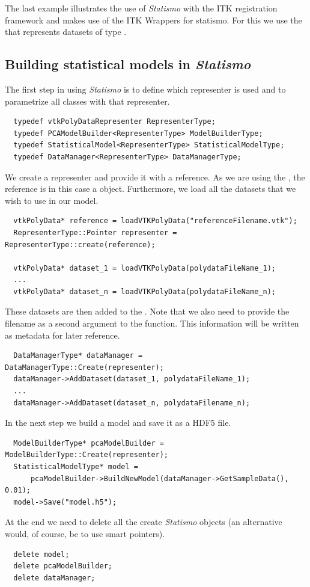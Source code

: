 \documentclass{InsightArticle}
\newcommand{\Statismo}{\emph{Statismo}\xspace}
\begin{document}
The last example illustrates the use of \Statismo with the ITK
registration framework and makes use of the ITK Wrappers for
statismo. For this we use the  that represents datasets
of type . 


\subsection{Building statistical models in \Statismo}

The first step in using \Statismo is to define which representer is used and to parametrize all classes with that 
representer. 
\begin{verbatim}
  typedef vtkPolyDataRepresenter RepresenterType;
  typedef PCAModelBuilder<RepresenterType> ModelBuilderType;
  typedef StatisticalModel<RepresenterType> StatisticalModelType;
  typedef DataManager<RepresenterType> DataManagerType;
\end{verbatim}

We create a representer and provide it with a reference. As we are
using the , the reference is in this case
a  object.
Furthermore, we load all the datasets that we wish to use in our model.
\begin{verbatim}
  vtkPolyData* reference = loadVTKPolyData("referenceFilename.vtk");
  RepresenterType::Pointer representer = RepresenterType::create(reference);

  vtkPolyData* dataset_1 = loadVTKPolyData(polydataFileName_1);
  ... 
  vtkPolyData* dataset_n = loadVTKPolyData(polydataFileName_n);
\end{verbatim}

These datasets are then added to the . Note that we also need to provide the filename as
a second argument to the  function. This information will be written as metadata for later
reference. 

\begin{verbatim}
  DataManagerType* dataManager =  DataManagerType::Create(representer);
  dataManager->AddDataset(dataset_1, polydataFileName_1);
  ...
  dataManager->AddDataset(dataset_n, polydataFilename_n);
\end{verbatim}
In the next step we build a model and save it as a HDF5 file. 
\begin{verbatim}
  ModelBuilderType* pcaModelBuilder = ModelBuilderType::Create(representer);
  StatisticalModelType* model =  
      pcaModelBuilder->BuildNewModel(dataManager->GetSampleData(), 0.01);
  model->Save("model.h5");
\end{verbatim}
At the end we need to delete all the create \Statismo objects (an alternative would, of course, be to use
smart pointers).
\begin{verbatim}
  delete model;
  delete pcaModelBuilder;
  delete dataManager;
\end{verbatim}
\end{document}
